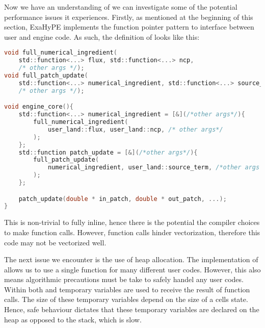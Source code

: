 Now we have an understanding of  we can investigate some of the potential performance issues it experiences.
Firstly, as mentioned at the beginning of this section, ExaHyPE implements the function pointer pattern to interface between user and engine code.
As such, the definition of  looks like this:
\begin{lstlisting}[language=c]
void full_numerical_ingredient(
    std::function<...> flux, std::function<...> ncp,
    /* other args */);
void full_patch_update(
    std::function<...> numerical_ingredient, std::function<...> source_term,
    /* other args */);

void engine_core(){
    std::function<...> numerical_ingredient = [&](/*other args*/){
        full_numerical_ingredient(
            user_land::flux, user_land::ncp, /* other args*/
        );
    };
    std::function patch_update = [&](/*other args*/){
        full_patch_update(
            numerical_ingredient, user_land::source_term, /*other args */
        );
    };

    patch_update(double * in_patch, double * out_patch, ...);
}
\end{lstlisting}
This is non-trivial to fully inline, hence there is the potential the compiler choices to make function calls.
However, function calls hinder vectorization, therefore this code may not be vectorized well.


The next issue we encounter is the use of heap allocation.
The implementation of  allows us to use a single function for many different user codes.
However, this also means algorithmic precautions must be take to safely handel any user codes.
Within both  and  temporary variables are used to receive the result of function calls.
The size of these temporary variables depend on the size of a cells state.
Hence, safe behaviour dictates that these temporary variables are declared on the heap as opposed to the stack, which is slow. 






